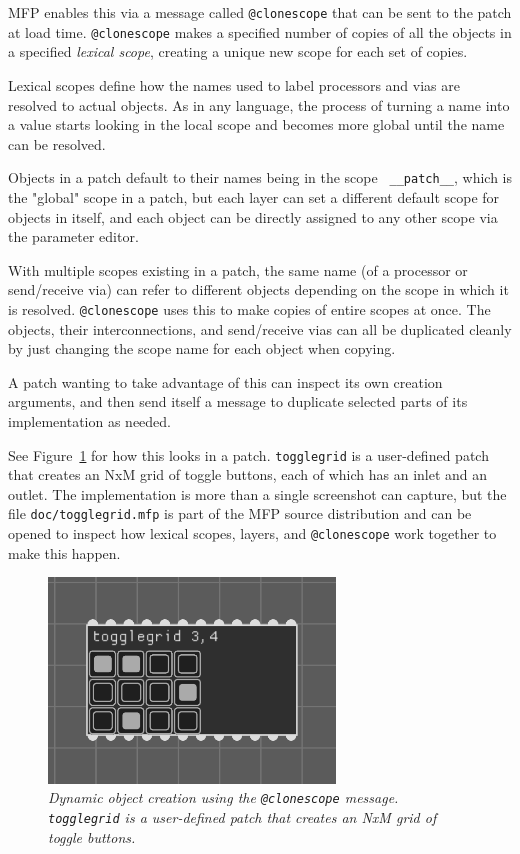 \documentclass[a4paper]{article}
\begin{document}
MFP enables this via a message called {\tt @clonescope}
that can be sent to the patch at load time. {\tt @clonescope}
makes a specified number of copies of all the objects in a
specified {\it lexical scope}, creating a unique new scope for
each set of copies.

Lexical scopes define how the names used to label processors and
vias are resolved to actual objects. As in any language, the
process of turning a name into a value starts looking in the
local scope and becomes more global until the name can be
resolved.

Objects in a patch default to their names being in the scope {\tt
\_\_patch\_\_}, which is the "global" scope in a patch, but each
layer can set a different default scope for objects in itself,
and each object can be directly assigned to any other scope via
the parameter editor.

With multiple scopes existing in a patch, the same name (of a
processor or send/receive via) can refer to different objects
depending on the scope in which it is resolved. {\tt @clonescope}
uses this to make copies of entire scopes at once. The objects,
their interconnections, and send/receive vias can all be
duplicated cleanly by just changing the scope name for each
object when copying.

A patch wanting to take advantage of this can inspect its own
creation arguments, and then send itself a message to duplicate
selected parts of its implementation as needed.

See Figure~\ref{fig:clonescope} for how this looks in a patch.
{\tt togglegrid} is a user-defined patch that creates an NxM grid
of toggle buttons, each of which has an inlet and an outlet.
The implementation is more than a single screenshot can capture,
but the file {\tt doc/togglegrid.mfp} is part of the MFP source
distribution and can be opened to inspect how lexical scopes,
layers, and {\tt @clonescope} work together to make this happen.

\begin{figure}[ht]
\centerline{\includegraphics[width=3in]{togglegrid.png}}
\caption{\label{fig:clonescope}{
    \it Dynamic object creation using the {\tt @clonescope} message.
    {\tt togglegrid} is a user-defined patch that creates an NxM
    grid of toggle buttons.
}}
\end{figure}
\end{document}
